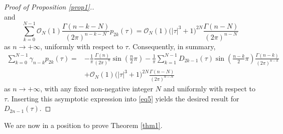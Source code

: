 \documentclass[pdftex]{sigma}
\numberwithin{equation}{section}
\begin{document}
\begin{proof}[Proof of Proposition \ref{prop1}.]
\[\]
and
\[
\sum_{k = 0}^{N - 1} \mathcal{O}_N(1) \frac{\Gamma (n - k - N)}{(2\pi )^{n - k - N} }p_{2k} (\tau )=\mathcal{O}_N (1)\bigl(\left| \tau \right|^3 + 1\bigr)^{2N} \frac{\Gamma (n - N)}{(2\pi )^{n - N}}
\]
as $n\to+\infty$, uniformly with respect to $\tau$. Consequently, in summary,
\begin{align*}
\sum_{k = 0}^{N - 1} \gamma _{n - k} p_{2k} (\tau ) ={}& -\frac{1}{\pi}\frac{\Gamma (n)}{(2\pi )^n } \sin \left( \frac{n}{2}\pi \right) -\frac{1}{\pi}\sum_{k = 1}^{N - 1} D_{2k - 1} (\tau )\sin \left( \frac{n - k}{2}\pi \right)\frac{\Gamma (n - k)}{(2\pi )^{n - k}} \\ & +\mathcal{O}_N (1)\bigl(\left| \tau \right|^3 + 1\bigr)^{2N} \frac{\Gamma (n - N)}{(2\pi )^{n - N}}
\end{align*}
as $n\to+\infty$, with any fixed non-negative integer $N$ and uniformly with respect to $\tau$. Inserting this asymptotic expression into \eqref{eq5} yields the desired result for $D_{2n - 1} (\tau )$.
\end{proof}

We are now in a position to prove Theorem \ref{thm1}.
\end{document}
